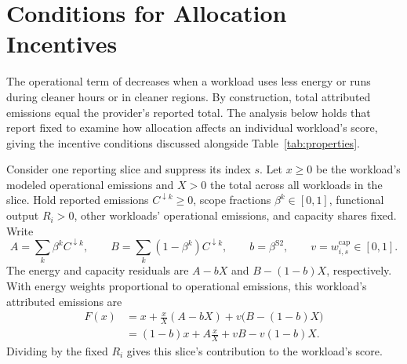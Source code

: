 \begingroup
\color{black}
\hypersetup{citecolor=black,linkcolor=black,urlcolor=black}
\section{Conditions for Allocation Incentives}
\label{app:operational-incentives}

The operational term of \RSCI decreases when a workload uses less energy or runs during cleaner hours or in cleaner regions.
By construction, total attributed emissions equal the provider's reported total.
The analysis below holds that report fixed to examine how allocation affects an individual workload's score, giving the incentive conditions discussed alongside Table~\ref{tab:properties}.

Consider one reporting slice and suppress its index $s$.
Let $x\geq0$ be the workload's modeled operational emissions and $X>0$ the total across all workloads in the slice.
Hold reported emissions $C^{\downarrow k}\geq0$, scope fractions $\beta^k\in[0,1]$, functional output $R_i>0$, other workloads' operational emissions, and capacity shares fixed.
Write
\begin{equation}
A=\sum_k\beta^k C^{\downarrow k},\qquad
B=\sum_k(1-\beta^k)C^{\downarrow k},\qquad
b=\beta^{\mathrm{S2}},\qquad v=w^{\mathrm{cap}}_{i,s}\in[0,1].
\end{equation}
The energy and capacity residuals are $A-bX$ and $B-(1-b)X$, respectively.
With energy weights proportional to operational emissions, this workload's attributed emissions are
\begin{equation}
\begin{aligned}
F(x)&=x+\frac{x}{X}(A-bX)+v\bigl(B-(1-b)X\bigr)\\
    &=(1-b)x+A\frac{x}{X}+vB-v(1-b)X.
\end{aligned}
\end{equation}
Dividing by the fixed $R_i$ gives this slice's contribution to the workload's score.

